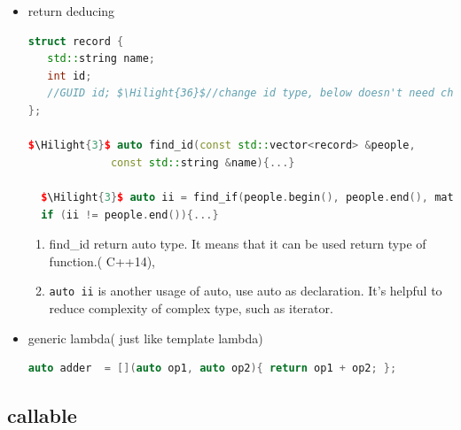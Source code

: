 \documentclass[a4paper,12pt,twoside]{book}
\newcommand{\Hilight}[1]{\makebox[0pt][l]{\color{yellow}\rule[-3pt]{#1em}{11pt}}}
\begin{document}
\begin{itemize}
\item return deducing
\begin{lstlisting}[frame=single, language=c++, mathescape=true]
struct record {
   std::string name;
   int id;
   //GUID id; $\Hilight{36}$//change id type, below doesn't need change
};

$\Hilight{3}$ auto find_id(const std::vector<record> &people,
             const std::string &name){...}

  $\Hilight{3}$ auto ii = find_if(people.begin(), people.end(), match_name );
  if (ii != people.end()){...}
\end{lstlisting}

\begin{enumerate}
\item find\_id return auto type. It means that it can be used return type of function.( C++14),
\item \verb=auto ii= is another usage of auto,  use auto as declaration. It's helpful to reduce complexity of complex type, such as iterator.
\end{enumerate}

\item generic lambda( just like template lambda)
\begin{lstlisting}[frame=single, language=c++]
auto adder  = [](auto op1, auto op2){ return op1 + op2; };
\end{lstlisting}

\end{itemize}

\subsection{callable}
\end{document}
